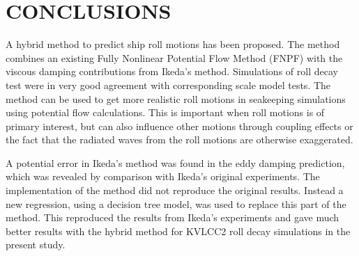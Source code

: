 \section*{CONCLUSIONS}\label{sec:conclusions}

A hybrid method to predict ship roll motions has been proposed. The
method combines an existing Fully Nonlinear Potential Flow Method (FNPF) with the viscous damping contributions from Ikeda's method. Simulations of roll decay test were in very good agreement with corresponding scale model tests. The method can be used to get more realistic roll motions in seakeeping simulations using potential flow calculations. This is important when roll motions is of primary interest, but can also influence other motions through coupling effects or the fact that the radiated waves from the roll motions are otherwise exaggerated.

A potential error in Ikeda's method was found in the eddy damping
prediction, which was revealed by comparison with Ikeda's original
experiments. The implementation of the method did not reproduce the
original results. Instead a new regression, using a decision tree model, was used to replace this part of the method. This reproduced the results from Ikeda's experiments and gave much better results with the hybrid method for KVLCC2 roll decay simulations in the present study.

